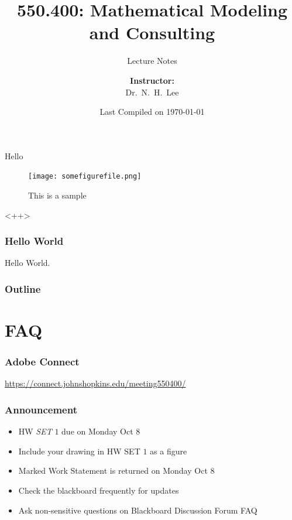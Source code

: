 \documentclass[hyperref={colorlinks=false},handout,10pt]{beamer}
\title{{\color{blue} \LARGE 550.400: Mathematical Modeling and Consulting\newline} }
\subtitle{{\color{red} \large Lecture Notes} }
\author{ 
    {\bf{Instructor:}} \\ 
Dr.~N.~H.~Lee \\ 
    \vspace{5pt}
}
\institute{JHU AMS 2012 FALL}
\date{\mygreen Last Compiled on \today}
\let\olditem\item
\renewcommand{\item}{\setlength{\itemsep}{0.5\baselineskip}\olditem}
\begin{document}
\begin{frame}[plain]
  \titlepage
\end{frame}

Hello

\begin{figure}
    \begin{center}
        \texttt{[image: somefigurefile.png]}
    \end{center}
    \caption{This is a sample}
    \label{fig:sample}
\end{figure}

\begin{env}
    <++>
\end{env}

\begin{frame}
    \frametitle{Hello World}
    Hello World.
\end{frame}


\begin{frame}%
  \frametitle{Outline}
  \tableofcontents
\end{frame}

\section{FAQ} 

\begin{frame}
    \frametitle{Adobe Connect}
    \begin{center}
        \Large
        \href{https://connect.johnshopkins.edu/meeting550400/}{https://connect.johnshopkins.edu/meeting550400/}
\end{center}
\end{frame}

\begin{frame}
    \frametitle{Announcement}
    \begin{itemize}
        \item HW \emph{SET} $1$ due on Monday Oct 8
        \item Include your drawing in HW SET $1$ as a figure
        \item Marked Work Statement is returned on Monday Oct 8
        \item Check the blackboard frequently for updates
        \item Ask non-sensitive questions on Blackboard Discussion Forum FAQ
    \end{itemize}
\end{frame}
\end{document}
